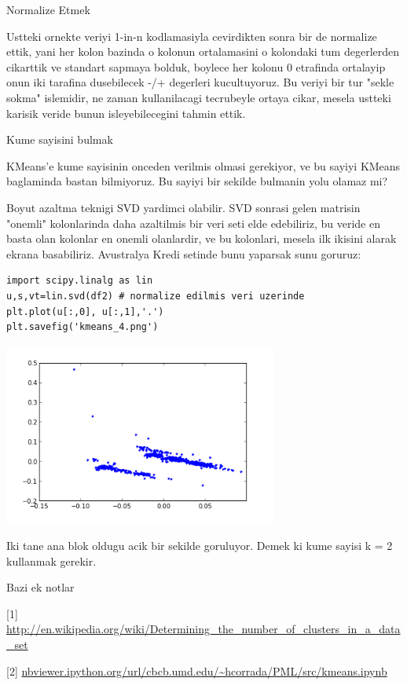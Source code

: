 \documentclass[12pt,fleqn]{article}\usepackage{../common}
\begin{document}
Normalize Etmek

Ustteki ornekte veriyi 1-in-n kodlamasiyla cevirdikten sonra bir de
normalize ettik, yani her kolon bazinda o kolonun ortalamasini o
kolondaki tum degerlerden cikarttik ve standart sapmaya bolduk,
boylece her kolonu 0 etrafinda ortalayip onun iki tarafina dusebilecek
-/+ degerleri kucultuyoruz. Bu veriyi bir tur "sekle sokma" islemidir,
ne zaman kullanilacagi tecrubeyle ortaya cikar, mesela ustteki karisik
veride bunun isleyebilecegini tahmin ettik. 

Kume sayisini bulmak

KMeans'e kume sayisinin onceden verilmis olmasi gerekiyor, ve bu
sayiyi KMeans baglaminda bastan bilmiyoruz. Bu sayiyi bir sekilde
bulmanin yolu olamaz mi?

Boyut azaltma teknigi SVD yardimci olabilir. SVD sonrasi gelen
matrisin "onemli" kolonlarinda daha azaltilmis bir veri seti elde
edebiliriz, bu veride en basta olan kolonlar en onemli olanlardir, ve
bu kolonlari, mesela ilk ikisini alarak ekrana basabiliriz. Avustralya
Kredi setinde bunu yaparsak sunu goruruz:

\begin{verbatim}
import scipy.linalg as lin
u,s,vt=lin.svd(df2) # normalize edilmis veri uzerinde
plt.plot(u[:,0], u[:,1],'.')
plt.savefig('kmeans_4.png')
\end{verbatim}

\includegraphics[height=6cm]{kmeans_4.png}

Iki tane ana blok oldugu acik bir sekilde goruluyor. Demek ki kume sayisi
k = 2 kullanmak gerekir. 

Bazi ek notlar

[1] \url{http://en.wikipedia.org/wiki/Determining_the_number_of_clusters_in_a_data_set}

[2] \url{nbviewer.ipython.org/url/cbcb.umd.edu/~hcorrada/PML/src/kmeans.ipynb}
\end{document}
